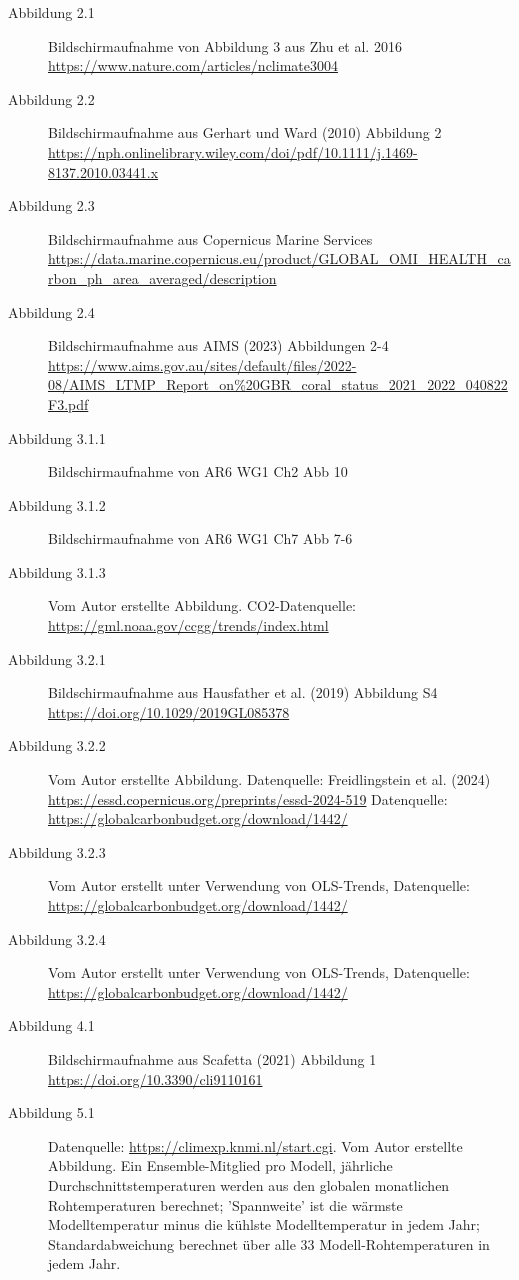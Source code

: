 \documentclass[12pt,paper=a4,DIV=12,parskip=never,chapterprefix=false,headings=standardclasses]{scrreprt}
\begin{document}
\cleardoublepage
\renewcommand{\listfigurename}{METADATEN FÜR ABBILDUNGEN UND TABELLEN}
\begin{description}
\item[Abbildung 2.1] Bildschirmaufnahme von Abbildung 3 aus Zhu et al. 2016 \url{https://www.nature.com/articles/nclimate3004}
\item[Abbildung 2.2] Bildschirmaufnahme aus Gerhart und Ward (2010) Abbildung 2 \url{https://nph.onlinelibrary.wiley.com/doi/pdf/10.1111/j.1469-8137.2010.03441.x}
\item[Abbildung 2.3] Bildschirmaufnahme aus Copernicus Marine Services \url{https://data.marine.copernicus.eu/product/GLOBAL_OMI_HEALTH_carbon_ph_area_averaged/description}
\item[Abbildung 2.4] Bildschirmaufnahme aus AIMS (2023) Abbildungen 2-4 \url{https://www.aims.gov.au/sites/default/files/2022-08/AIMS_LTMP_Report_on%20GBR_coral_status_2021_2022_040822F3.pdf}
\item[Abbildung 3.1.1] Bildschirmaufnahme von AR6 WG1 Ch2 Abb 10
\item[Abbildung 3.1.2] Bildschirmaufnahme von AR6 WG1 Ch7 Abb 7-6
\item[Abbildung 3.1.3] Vom Autor erstellte Abbildung. CO2-Datenquelle: \url{https://gml.noaa.gov/ccgg/trends/index.html}
\item[Abbildung 3.2.1] Bildschirmaufnahme aus Hausfather et al. (2019) Abbildung S4 \url{https://doi.org/10.1029/2019GL085378}
\item[Abbildung 3.2.2] Vom Autor erstellte Abbildung. Datenquelle: Freidlingstein et al. (2024) \url{https://essd.copernicus.org/preprints/essd-2024-519}
Datenquelle: \url{https://globalcarbonbudget.org/download/1442/}
\item[Abbildung 3.2.3] Vom Autor erstellt unter Verwendung von OLS-Trends, Datenquelle: \url{https://globalcarbonbudget.org/download/1442/}
\item[Abbildung 3.2.4] Vom Autor erstellt unter Verwendung von OLS-Trends, Datenquelle: \url{https://globalcarbonbudget.org/download/1442/}
\item[Abbildung 4.1] Bildschirmaufnahme aus Scafetta (2021) Abbildung 1 \url{https://doi.org/10.3390/cli9110161}
\item[Abbildung 5.1] Datenquelle: \url{https://climexp.knmi.nl/start.cgi}. Vom Autor erstellte Abbildung. Ein Ensemble-Mitglied pro Modell, jährliche Durchschnittstemperaturen werden aus den globalen monatlichen Rohtemperaturen berechnet; 'Spannweite' ist die wärmste Modelltemperatur minus die kühlste Modelltemperatur in jedem Jahr; Standardabweichung berechnet über alle 33 Modell-Rohtemperaturen in jedem Jahr.

\end{description}
\end{document}
